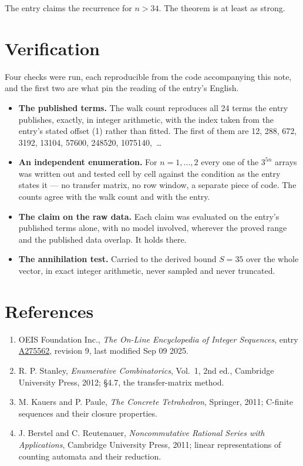 \documentclass[11pt]{article}
\theoremstyle{definition}
\begin{document}
The entry claims the recurrence for $n > 34$. The theorem is at least as strong.

\section{Verification}

Four checks were run, each reproducible from the code accompanying this note, and the first two are what pin the reading of the entry's English.

\begin{itemize}

\item {\bfseries The published terms.} The walk count reproduces all 24 terms the entry publishes, exactly, in integer arithmetic, with the index taken from the entry's stated offset (1) rather than fitted. The first of them are 12, 288, 672, 3192, 13104, 57600, 248520, 1075140,~\dots

\item {\bfseries An independent enumeration.} For $n = 1,\dots,2$ every one of the $3^{5n}$ arrays was written out and tested cell by cell against the condition as the entry states it --- no transfer matrix, no row window, a separate piece of code. The counts agree with the walk count and with the entry.

\item {\bfseries The claim on the raw data.} Each claim was evaluated on the entry's published terms alone, with no model involved, wherever the proved range and the published data overlap. It holds there.

\item {\bfseries The annihilation test.} Carried to the derived bound $S = 35$ over the whole vector, in exact integer arithmetic, never sampled and never truncated.

\end{itemize}

\section{References}

\begin{enumerate}

\item OEIS Foundation Inc., \emph{The On-Line Encyclopedia of Integer Sequences}, entry \href{https://oeis.org/A275562}{A275562}, revision 9, last modified Sep 09 2025.

\item R. P. Stanley, \emph{Enumerative Combinatorics}, Vol.~1, 2nd ed., Cambridge University Press, 2012; \S4.7, the transfer-matrix method.

\item M. Kauers and P. Paule, \emph{The Concrete Tetrahedron}, Springer, 2011; C-finite sequences and their closure properties.

\item J. Berstel and C. Reutenauer, \emph{Noncommutative Rational Series with Applications}, Cambridge University Press, 2011; linear representations of counting automata and their reduction.

\end{enumerate}
\end{document}
